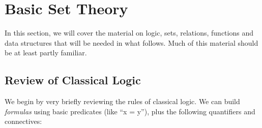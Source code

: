 \section{Basic Set Theory}
\label{BasisSetTheory}

%
In this section, we will cover the material on logic, sets, relations,
functions and data structures that will be needed in what follows.
Much of this material should be at least partly familiar.

\subsection{Review of Classical Logic}

%
%
We begin by very briefly reviewing the rules of classical logic. We
can build \emph{formulas} using basic predicates (like ``x = y''),
%
%
plus the following quantifiers and connectives:
